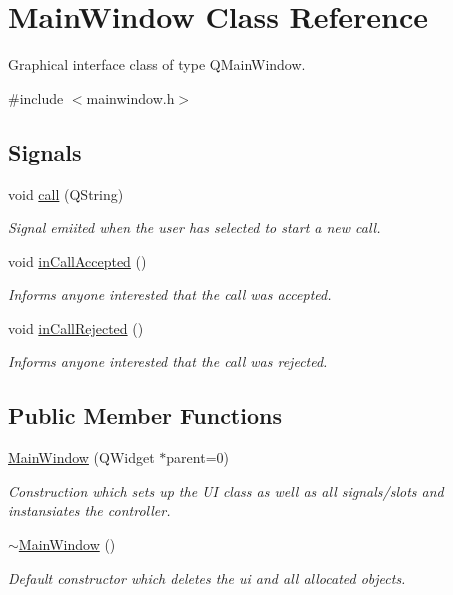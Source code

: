 \hypertarget{class_main_window}{
\section{\-Main\-Window \-Class \-Reference}
\label{class_main_window}
}


\-Graphical interface class of type \-Q\-Main\-Window.  




{\ttfamily \#include $<$mainwindow.\-h$>$}

\subsection*{\-Signals}
\begin{DoxyCompactItemize}
\item 
void \hyperlink{class_main_window_aea2d395eaa1a1b353b7838731595a3f7}{call} (\-Q\-String)
\begin{DoxyCompactList}\small\item\em \-Signal emiited when the user has selected to start a new call. \end{DoxyCompactList}\item 
void \hyperlink{class_main_window_ac1ad769a26f328f8184cd63833af4539}{in\-Call\-Accepted} ()
\begin{DoxyCompactList}\small\item\em \-Informs anyone interested that the call was accepted. \end{DoxyCompactList}\item 
void \hyperlink{class_main_window_a3322ffd0516e30afc70f8b623301c426}{in\-Call\-Rejected} ()
\begin{DoxyCompactList}\small\item\em \-Informs anyone interested that the call was rejected. \end{DoxyCompactList}\end{DoxyCompactItemize}
\subsection*{\-Public \-Member \-Functions}
\begin{DoxyCompactItemize}
\item 
\hyperlink{class_main_window_a8b244be8b7b7db1b08de2a2acb9409db}{\-Main\-Window} (\-Q\-Widget $\ast$parent=0)
\begin{DoxyCompactList}\small\item\em \-Construction which sets up the \-U\-I class as well as all signals/slots and instansiates the controller. \end{DoxyCompactList}\item 
\hypertarget{class_main_window_ae98d00a93bc118200eeef9f9bba1dba7}{
\hyperlink{class_main_window_ae98d00a93bc118200eeef9f9bba1dba7}{$\sim$\-Main\-Window} ()}
\label{class_main_window_ae98d00a93bc118200eeef9f9bba1dba7}

\begin{DoxyCompactList}\small\item\em \-Default constructor which deletes the ui and all allocated objects. \end{DoxyCompactList}\end{DoxyCompactItemize}


